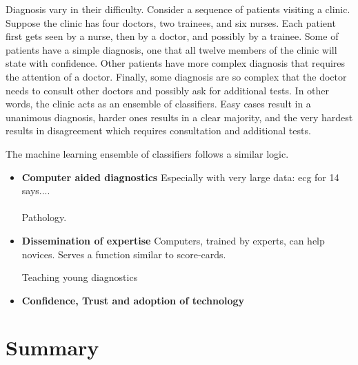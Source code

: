 \documentclass[9pt,twocolumn,twoside]{pnas-new}
\begin{document}
  Diagnosis vary in their difficulty. Consider a sequence of
  patients visiting a clinic. Suppose the clinic has four doctors, two
  trainees, and six nurses. Each patient first gets seen by a nurse,
  then by a doctor, and possibly by a trainee. Some of patients have
  a simple diagnosis, one that all twelve members of the clinic will
  state with confidence. Other patients have more complex diagnosis
  that requires the attention of a doctor. Finally, some diagnosis are
  so complex that the doctor needs to consult other doctors and
  possibly ask for additional tests. In other words, the clinic acts
  as an ensemble of classifiers. Easy cases result in a unanimous
  diagnosis, harder ones results in a clear majority, and the very
  hardest results in disagreement which requires consultation and
  additional tests.

  The machine learning ensemble of classifiers follows a similar
  logic. 

\begin{itemize}
\item{\bf Computer aided diagnostics}
  Especially with very large data: ecg for 14 says.... \\
  ~\\

Pathology.

\item {\bf Dissemination of expertise}
Computers, trained by experts, can help novices.  Serves a function
similar to score-cards.

Teaching young diagnostics
\item { \bf Confidence, Trust and adoption of technology}
\end{itemize}

\section*{Summary}

% 

\end{document}

